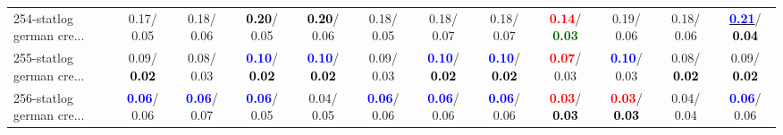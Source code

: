 \begin{table}[h]
\begin{center}
{\begin{tabular}{lc|c|c|c|c|c|c|c|c|c|c}
254-statlog german cre... &   0.17/  0.05 &   0.18/  0.06 & \textcolor{black}{\textbf{  0.20}}/  0.05 & \textcolor{black}{\textbf{  0.20}}/  0.06 &   0.18/  0.05 &   0.18/  0.07 &   0.18/  0.07 & \textcolor{red}{\textbf{  0.14}}/\textcolor{darkgreen}{\textbf{  0.03}} &   0.19/  0.06 &   0.18/  0.06 & \underline{\textcolor{blue}{\textbf{  0.21}}}/\textcolor{black}{\textbf{  0.04}} \\
255-statlog german cre... &   0.09/\textcolor{black}{\textbf{  0.02}} &   0.08/  0.03 & \textcolor{blue}{\textbf{  0.10}}/\textcolor{black}{\textbf{  0.02}} & \textcolor{blue}{\textbf{  0.10}}/\textcolor{black}{\textbf{  0.02}} &   0.09/  0.03 & \textcolor{blue}{\textbf{  0.10}}/\textcolor{black}{\textbf{  0.02}} & \textcolor{blue}{\textbf{  0.10}}/\textcolor{black}{\textbf{  0.02}} & \textcolor{red}{\textbf{  0.07}}/  0.03 & \textcolor{blue}{\textbf{  0.10}}/  0.03 &   0.08/\textcolor{black}{\textbf{  0.02}} &   0.09/\textcolor{black}{\textbf{  0.02}} \\
256-statlog german cre... & \textcolor{blue}{\textbf{  0.06}}/  0.06 & \textcolor{blue}{\textbf{  0.06}}/  0.07 & \textcolor{blue}{\textbf{  0.06}}/  0.05 &   0.04/  0.05 & \textcolor{blue}{\textbf{  0.06}}/  0.06 & \textcolor{blue}{\textbf{  0.06}}/  0.06 & \textcolor{blue}{\textbf{  0.06}}/  0.06 & \textcolor{red}{\textbf{  0.03}}/\textcolor{black}{\textbf{  0.03}} & \textcolor{red}{\textbf{  0.03}}/\textcolor{black}{\textbf{  0.03}} &   0.04/  0.04 & \textcolor{blue}{\textbf{  0.06}}/  0.06 \\\end{tabular}}\label{stratsALCKappa7Allalla}
\end{center}
\end{table}
